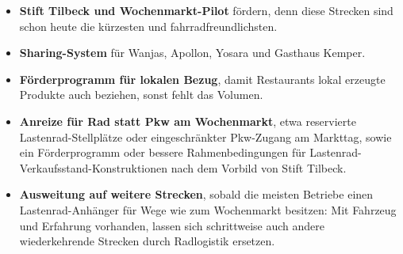 \documentclass[a4paper,11pt,parskip=half,numbers=noenddot]{scrreprt}
\begin{document}
\begin{itemize}
\item \textbf{Stift Tilbeck und Wochenmarkt-Pilot} fördern, denn diese Strecken sind schon heute die kürzesten und fahrradfreundlichsten.
\item \textbf{Sharing-System} für Wanjas, Apollon, Yosara und Gasthaus Kemper.
\item \textbf{Förderprogramm für lokalen Bezug}, damit Restaurants lokal erzeugte Produkte auch beziehen, sonst fehlt das Volumen.
\item \textbf{Anreize für Rad statt Pkw am Wochenmarkt}, etwa reservierte Lastenrad-Stellplätze oder eingeschränkter Pkw-Zugang am Markttag, sowie ein Förderprogramm oder bessere Rahmenbedingungen für Lastenrad-Verkaufsstand-Konstruktionen nach dem Vorbild von Stift Tilbeck.
\item \textbf{Ausweitung auf weitere Strecken}, sobald die meisten Betriebe einen Lastenrad-Anhänger für Wege wie zum Wochenmarkt besitzen: Mit Fahrzeug und Erfahrung vorhanden, lassen sich schrittweise auch andere wiederkehrende Strecken durch Radlogistik ersetzen.
\end{itemize}

\clearpage
\printbibliography[heading=bibintoc,title={Literaturverzeichnis}]
\end{document}
